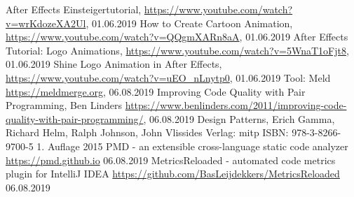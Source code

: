\begin{thebibliography}{9}
After Effects Einsteigertutorial,
\url{https://www.youtube.com/watch?v=wrKdozeXA2Ul},
01.06.2019
How to Create Cartoon Animation,
\url{https://www.youtube.com/watch?v=QQgmXARn8aA},
01.06.2019
After Effects Tutorial: Logo Animations,
\url{https://www.youtube.com/watch?v=5WnaT1oFjt8},
01.06.2019
Shine Logo Animation in After Effects,
\url{https://www.youtube.com/watch?v=uEO_nLnytp0},
01.06.2019
Tool: Meld
\url{https://meldmerge.org},
06.08.2019
Improving Code Quality with Pair Programming, Ben Linders
\url{https://www.benlinders.com/2011/improving-code-quality-with-pair-programming/},
06.08.2019
Design Patterns,
Erich Gamma, Richard Helm, Ralph Johnson, John Vlissides
Verlag: mitp
ISBN: 978-3-8266-9700-5
1. Auflage 2015
PMD - an extensible cross-language static code analyzer
\url{https://pmd.github.io}
06.08.2019
MetricsReloaded - automated code metrics plugin for IntelliJ IDEA
\url{https://github.com/BasLeijdekkers/MetricsReloaded}
06.08.2019
\end{thebibliography}